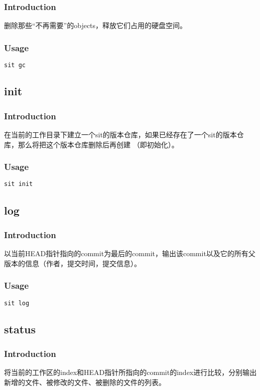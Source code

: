 \subsubsection*{Introduction}
删除那些``不再需要''的objects，释放它们占用的硬盘空间。
\subsubsection*{Usage}
\begin{lstlisting}[language=sh]
sit gc
\end{lstlisting}

\subsection{init}
\subsubsection*{Introduction}
在当前的工作目录下建立一个sit的版本仓库，如果已经存在了一个sit的版本仓库，那么将把这个版本仓库删除后再创建
（即初始化）。
\subsubsection*{Usage}
\begin{lstlisting}[language=sh]
sit init
\end{lstlisting}

\subsection{log}
\subsubsection*{Introduction}
以当前HEAD指针指向的commit为最后的commit，输出该commit以及它的所有父版本的信息（作者，提交时间，提交信息）。
\subsubsection*{Usage}
\begin{lstlisting}[language=sh]
sit log
\end{lstlisting}

\subsection{status}
\subsubsection*{Introduction}
将当前的工作区的index和HEAD指针所指向的commit的index进行比较，分别输出新增的文件、被修改的文件、被删除的文件的列表。
